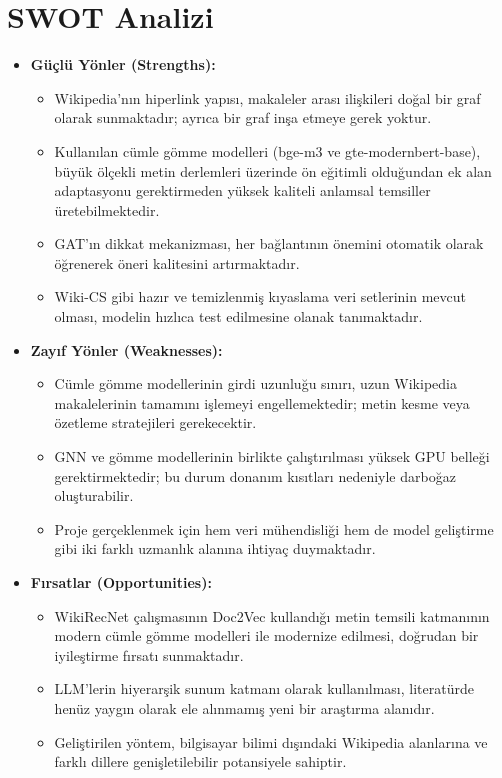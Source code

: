 \documentclass[12pt, a4paper]{article}
\begin{document}
\section{SWOT Analizi}

\begin{itemize}
    \item \textbf{Güçlü Yönler (Strengths):}
    \begin{itemize}
        \item Wikipedia'nın hiperlink yapısı, makaleler arası ilişkileri doğal bir graf olarak sunmaktadır; ayrıca bir graf inşa etmeye gerek yoktur.
        \item Kullanılan cümle gömme modelleri (bge-m3 ve gte-modernbert-base), büyük ölçekli metin derlemleri üzerinde ön eğitimli olduğundan ek alan adaptasyonu gerektirmeden yüksek kaliteli anlamsal temsiller üretebilmektedir.
        \item GAT'ın dikkat mekanizması, her bağlantının önemini otomatik olarak öğrenerek öneri kalitesini artırmaktadır.
        \item Wiki-CS \cite{mernyei2020wikics} gibi hazır ve temizlenmiş kıyaslama veri setlerinin mevcut olması, modelin hızlıca test edilmesine olanak tanımaktadır.
    \end{itemize}

    \item \textbf{Zayıf Yönler (Weaknesses):}
    \begin{itemize}
        \item Cümle gömme modellerinin girdi uzunluğu sınırı, uzun Wikipedia makalelerinin tamamını işlemeyi engellemektedir; metin kesme veya özetleme stratejileri gerekecektir.
        \item GNN ve gömme modellerinin birlikte çalıştırılması yüksek GPU belleği gerektirmektedir; bu durum donanım kısıtları nedeniyle darboğaz oluşturabilir.
        \item Proje gerçeklenmek için hem veri mühendisliği hem de model geliştirme gibi iki farklı uzmanlık alanına ihtiyaç duymaktadır.
    \end{itemize}

    \item \textbf{Fırsatlar (Opportunities):}
    \begin{itemize}
        \item WikiRecNet \cite{wikirecnet2020} çalışmasının Doc2Vec kullandığı metin temsili katmanının modern cümle gömme modelleri ile modernize edilmesi, doğrudan bir iyileştirme fırsatı sunmaktadır.
        \item LLM'lerin hiyerarşik sunum katmanı olarak kullanılması, literatürde henüz yaygın olarak ele alınmamış yeni bir araştırma alanıdır.
        \item Geliştirilen yöntem, bilgisayar bilimi dışındaki Wikipedia alanlarına ve farklı dillere genişletilebilir potansiyele sahiptir.
    \end{itemize}


\end{itemize}
\end{document}
